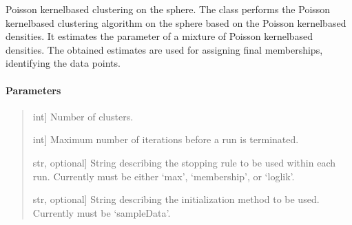 \documentclass[letterpaper,10pt,english,openany,oneside]{sphinxmanual}
\begin{document}
\begin{fulllineitems}
\label{\detokenize{api_reference/generated/QuadratiK.spherical_clustering.PKBC:QuadratiK.spherical_clustering.PKBC}}
\pysigstartsignatures
{}
\pysigstopsignatures
\sphinxAtStartPar
Poisson kernel\sphinxhyphen{}based clustering on the sphere. 
The class performs the Poisson kernel\sphinxhyphen{}based clustering algorithm 
on the sphere based on the Poisson kernel\sphinxhyphen{}based densities. It estimates
the parameter of a mixture of Poisson kernel\sphinxhyphen{}based densities. The obtained
estimates are used for assigning final memberships, identifying the data points.


\paragraph{Parameters}
\label{\detokenize{api_reference/generated/QuadratiK.spherical_clustering.PKBC:parameters}}\begin{quote}
\begin{description}
\sphinxlineitem{num\_clust}{[}int{]}
\sphinxAtStartPar
Number of clusters.

\sphinxlineitem{max\_iter}{[}int{]}
\sphinxAtStartPar
Maximum number of iterations before a run is terminated.

\sphinxlineitem{stopping\_rule}{[}str, optional{]}
\sphinxAtStartPar
String describing the stopping rule to be used within each run. 
Currently must be either ‘max’, ‘membership’, or ‘loglik’.

\sphinxlineitem{init\_method}{[}str, optional{]}
\sphinxAtStartPar
String describing the initialization method to be used. 
Currently must be ‘sampleData’.


\end{description}
\end{quote}
\end{fulllineitems}
\end{document}
